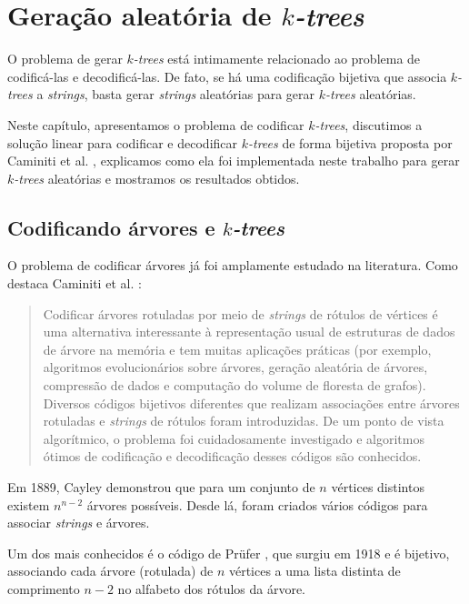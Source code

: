 \chapter{Geração aleatória de \emph{$k$-trees}}
\label{cap:geracao}

O problema de gerar \emph{$k$-trees} está intimamente relacionado ao problema de codificá-las e decodificá-las. De fato, se há uma codificação bijetiva que associa \emph{$k$-trees} a \emph{strings}, basta gerar \emph{strings} aleatórias para gerar \emph{$k$-trees} aleatórias.

Neste capítulo, apresentamos o problema de codificar \emph{$k$-trees}, discutimos a solução linear para codificar e decodificar \emph{$k$-trees} de forma bijetiva proposta por Caminiti et al. \cite{caminiti}, explicamos como ela foi implementada neste trabalho para gerar \emph{$k$-trees} aleatórias e mostramos os resultados obtidos.

\section{Codificando árvores e \emph{$k$-trees}}

O problema de codificar árvores já foi amplamente estudado na literatura. Como destaca Caminiti et al. \cite{caminiti}:

\begin{quotation}
  Codificar árvores rotuladas por meio de \emph{strings} de rótulos de vértices é uma alternativa interessante à representação usual de estruturas de dados de árvore na memória e tem muitas aplicações práticas (por exemplo, algoritmos evolucionários sobre árvores, geração aleatória de árvores, compressão de dados e computação do volume de floresta de grafos). Diversos códigos bijetivos diferentes que realizam associações entre árvores rotuladas e \emph{strings} de rótulos foram introduzidas. De um ponto de vista algorítmico, o problema foi cuidadosamente investigado e algoritmos ótimos de codificação e decodificação desses códigos são conhecidos.
\end{quotation}

Em 1889, Cayley \cite{cayley} demonstrou que para um conjunto de $n$ vértices distintos existem $n^{n-2}$ árvores possíveis. Desde lá, foram criados vários códigos para associar \emph{strings} e árvores.

Um dos mais conhecidos é o código de Prüfer \cite{prufer}, que surgiu em 1918 e é bijetivo, associando cada árvore (rotulada) de $n$ vértices a uma lista distinta de comprimento $n-2$ no alfabeto dos rótulos da árvore.

